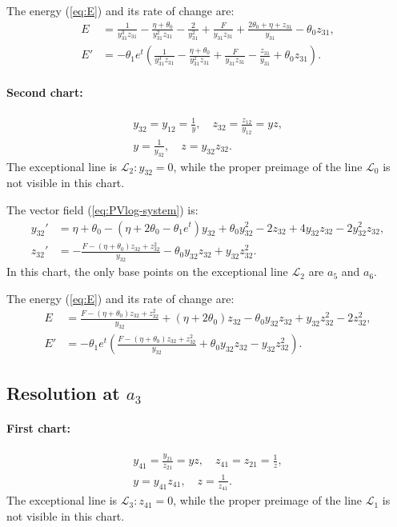 The energy (\ref{eq:E}) and its rate of change are:
$$
\begin{aligned}
E&=
\frac{1}{y_{31}^3 z_{31}}
-\frac{\eta+\theta_0}{y_{31}^2 z_{31}}
-\frac{2}{y_{31}^2}
+\frac{F}{y_{31} z_{31}}+\frac{2 \theta_0+\eta+z_{31}}{y_{31}}-\theta_0 z_{31}
,\\
E'&=
-\theta_1 e^t
\left(
\frac{1}{y_{31}^3 z_{31}}
-\frac{\eta+\theta_0}{y_{31}^2 z_{31}}+\frac{F}{y_{31} z_{31}}-\frac{z_{31}}{y_{31}}+\theta_0 z_{31}
\right)
.
\end{aligned}
$$

\paragraph{Second chart:}
\begin{gather*}
y_{32}=y_{12}=\frac1{y},
\quad
z_{32}=\frac{z_{12}}{y_{12}}=yz,
\\
y=\frac1{y_{32}},
\quad
z=y_{32}z_{32}.
\end{gather*}
The exceptional line is $\mathcal{L}_2 : y_{32}=0$, while the proper preimage of the line $\mathcal{L}_{0}$ is not visible in this chart. 

The vector field (\ref{eq:PVlog-system}) is:
$$
\begin{aligned}
y_{32}'&=
\eta + \theta_0 - (\eta + 2 \theta_0-\theta_1 e^t) y_{32} + \theta_0 y_{32}^2 - 2 z_{32} + 
 4 y_{32} z_{32} - 2 y_{32}^2 z_{32}
,
\\
z_{32}'&=
-\frac{F-(\eta+\theta_0) z_{32}+z_{32}^2}{y_{32}} - \theta_0 y_{32} z_{32} + y_{32} z_{32}^2
.
\end{aligned}
$$
In this chart, the only base points on the exceptional line $\mathcal{L}_2$ are $a_5$ and $a_6$.

The energy (\ref{eq:E}) and its rate of change are:
$$
\begin{aligned}
E&=
\frac{F-(\eta+\theta_0) z_{32}+z_{32}^2}{y_{32}}
+(\eta+ 2 \theta_0)z_{32}-\theta_0 y_{32} z_{32}+y_{32} z_{32}^2-2 z_{32}^2
,
\\
E'&=
-\theta_1 e^t
\left(
\frac{F-(\eta+\theta_0) z_{32}+z_{32}^2}{y_{32}}
+\theta_0 y_{32} z_{32}-y_{32} z_{32}^2
\right)
. 
\end{aligned}
$$


\subsection{Resolution at $a_3$}
\paragraph{First chart:}
\begin{gather*}
y_{41}=\frac{y_{21}}{z_{21}}=yz,
\quad
z_{41}=z_{21}=\frac1z,
\\
y=y_{41}z_{41},
\quad
z=\frac{1}{z_{41}}.
\end{gather*}
The exceptional line is $\mathcal{L}_3 : z_{41}=0$, while the proper preimage of the line $\mathcal{L}_{1}$ is not visible in this chart. 

